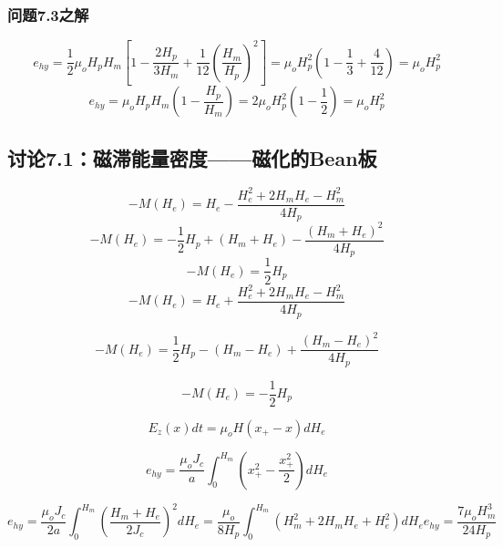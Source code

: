 \subsubsection{问题7.3之解}

\begin{equation}%
e_{hy}=\frac{1}{2}\mu_oH_pH_m\left[1-\frac{2H_p}{3H_m}+\frac{1}{12}\left(\frac{H_m}{H_p}\right)^2\right]
=\mu_oH_{p}^{2}\left(1-\frac{1}{3}+\frac{4}{12}\right)=\mu_oH_{p}^{2}
\end{equation}
\begin{equation}%
e_{hy}=\mu_oH_pH_m\left(1-\frac{H_p}{H_m}\right) 
=2\mu_oH_{p}^{2}\left(1-\frac{1}{2}\right)=\mu_oH_{p}^{2}
\end{equation}


\subsection{讨论7.1：磁滞能量密度——磁化的Bean板}

\begin{equation}%
-M(H_e)=H_e-\frac{H_{e}^{2}+2H_mH_e-H_{m}^{2}}{4H_p}
\end{equation}
\begin{equation}%
-M(H_e)=-\frac{1}{2}H_p+(H_m+H_e)-\frac{(H_m+H_e)^2}{4H_p}
\end{equation}
\begin{equation}%
-M(H_e)=\frac{1}{2}H_p
\end{equation}
\begin{equation}%
-M(H_e)=H_e+\frac{H_{e}^{2}+2H_mH_e-H_{m}^{2}}{4H_p}
\end{equation}


\begin{equation}%
-M(H_e)=\frac{1}{2}H_p-(H_m-H_e)+\frac{(H_m-H_e)^2}{4H_p}
\end{equation}


\begin{equation}%
-M(H_e)=-\frac{1}{2}H_p
\end{equation}


\begin{equation}%
E_z(x)dt=\mu_oH(x_+-x)dH_e
\end{equation}


\begin{equation}%
e_{hy}=\frac{\mu_oJ_c}{a}\int_{0}^{H_m}\left(x_{+}^{2}-\frac{x_{+}^{2}}{2}\right)dH_e
\end{equation}


\begin{equation}%
e_{hy}=\frac{\mu_oJ_c}{2a}\int_{0}^{H_m}\left(\frac{H_m+H_e}{2J_c}\right)^2dH_e 
=\frac{\mu_o}{8H_p}\int_{0}^{H_m}(H_{m}^{2}+2H_mH_e+H_{e}^{2})dH_e
e_{hy}=\frac{7\mu_oH_{m}^{3}}{24H_p}
\end{equation}


